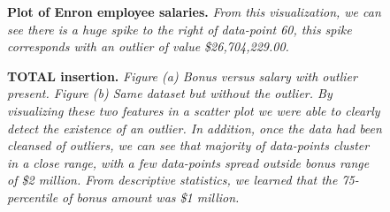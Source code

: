 \documentclass[twoside,openright,titlepage,numbers=noenddot,headinclude,%
               footinclude=true,cleardoublepage=empty,abstractoff,BCOR=5mm,%
               paper=a4,fontsize=11pt,ngerman,american]{scrreprt}
\numberwithin{theorem}{chapter}
\numberwithin{definition}{chapter}
\numberwithin{algorithm}{chapter}
\numberwithin{figure}{chapter}
\numberwithin{table}{chapter}
\numberwithin{equation}{chapter}
\begin{document}
\begin{figure}[!hbtp]
\centering
    
    \caption{\textbf{Plot of Enron employee salaries.}\textit{ From this visualization, we can see there is a huge spike to the right of data-point 60, this spike corresponds with an outlier of value \$26,704,229.00.}}
\end{figure}

\begin{figure}[!hbtp]
\centering
    
    \caption{\textbf{TOTAL insertion.} \textit{Figure (a) Bonus versus salary with outlier present. Figure (b) Same dataset but without the outlier. By visualizing these two features in a scatter plot we were able to clearly detect the existence of an outlier. In addition, once the data had been cleansed of outliers, we can see that majority of data-points cluster in a close range, with a few data-points spread outside bonus range of \$2 million. From descriptive statistics, we learned that the 75-percentile of bonus amount was \$1 million. }}
\end{figure}
\end{document}
